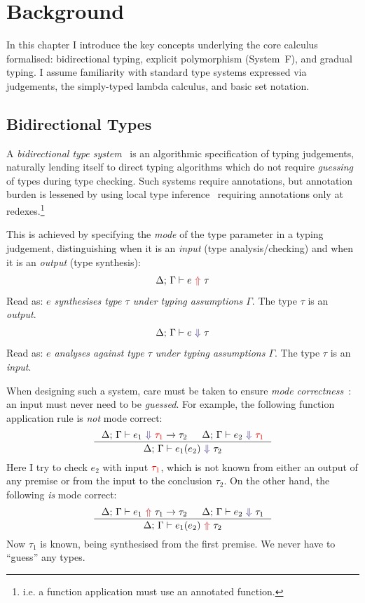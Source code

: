 \section{Background}
\label{sec:background}

In this chapter I introduce the key concepts underlying the core calculus formalised: bidirectional typing, explicit polymorphism (System~F), and gradual typing. I assume familiarity with standard type systems expressed via judgements, the simply-typed lambda calculus, and basic set notation.

\subsection{Bidirectional Types}
\label{sec:bidirectional-types}

A \textit{bidirectional type system}~\cite{BidirectionalTypes} is an algorithmic specification of typing judgements, naturally lending itself to direct typing algorithms which do not require \textit{guessing} of types during type checking. Such systems require annotations, but annotation burden is lessened by using local type inference~\cite{LocalInference} requiring annotations only at redexes.\footnote{i.e. a function application must use an annotated function.}

This is achieved by specifying the \textit{mode} of the type parameter in a typing judgement, distinguishing when it is an \textit{input} (type analysis/checking) and when it is an \textit{output} (type synthesis):
\[\synthesis{e}{\tau}\]
Read as: \textit{$e$ synthesises type $\tau$ under typing assumptions $\Gamma$}. The type $\tau$ is an \textit{output}.
\[\analysis{e}{\tau}\]
Read as: \textit{$e$ analyses against type $\tau$ under typing assumptions $\Gamma$}. The type $\tau$ is an \textit{input}.

When designing such a system, care must be taken to ensure \textit{mode correctness}~\cite{ModeCorrectness}: an input must never need to be \textit{guessed}. For example, the following function application rule is \textit{not} mode correct:
\[\inference{\analysis{e_1}{{\color{red}\tau_1} \to \tau_2} & \analysis{e_2}{{\color{red}\tau_1}}}{\analysis{e_1(e_2)}{\tau_2}}\]
Here I try to check $e_2$ with input ${\color{red}\tau_1}$, which is not known from either an output of any premise or from the input to the conclusion $\tau_2$. On the other hand, the following \textit{is} mode correct:
\[\inference{\synthesis{e_1}{\tau_1 \to \tau_2} & \analysis{e_2}{\tau_1}}{\synthesis{e_1(e_2)}{\tau_2}}\]
Now $\tau_1$ is known, being synthesised from the first premise. We never have to ``guess'' any types.

